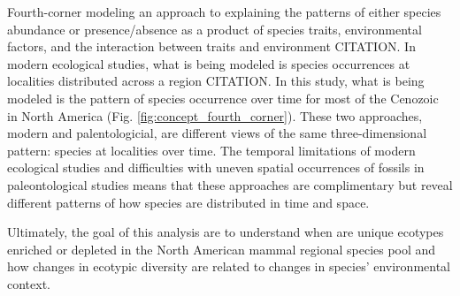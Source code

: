 \documentclass[12pt,letterpaper]{article}
\begin{document}
Fourth-corner modeling an approach to explaining the patterns of either species abundance or presence/absence as a product of species traits, environmental factors, and the interaction between traits and environment CITATION. In modern ecological studies, what is being modeled is species occurrences at localities distributed across a region CITATION. In this study, what is being modeled is the pattern of species occurrence over time for most of the Cenozoic in North America (Fig. \ref{fig:concept_fourth_corner}). These two approaches, modern and palentologicial, are different views of the same three-dimensional pattern: species at localities over time. The temporal limitations of modern ecological studies and difficulties with uneven spatial occurrences of fossils in paleontological studies means that these approaches are complimentary but reveal different patterns of how species are distributed in time and space.

%
%






Ultimately, the goal of this analysis are to understand when are unique ecotypes enriched or depleted in the North American mammal regional species pool and how changes in ecotypic diversity are related to changes in species' environmental context.
\end{document}
